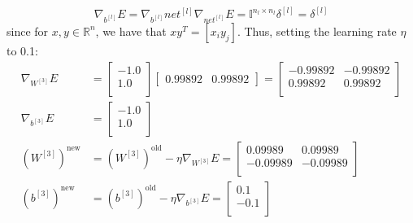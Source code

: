 \documentclass{exam}
\begin{document}
\begin{questions}
\begin{itemize}
            \begin{equation}
                \nabla_{b^{[l]}} E = \nabla_{b^{[l]}} net^{[l] }  \nabla_{net^{[l]}} E = \mathbb{I}^{n_l \times n_l} \delta^{[l]} = \delta^{[l]} \label{eq:4}
            \end{equation}
            since for $x, y \in \mathbb{R}^n$, we have that $xy^T = [x_i y_j]$. Thus, setting the learning rate  $\eta$ to 0.1:
            \begin{align*}
                \nabla_{W^{[3]}} E &= 
                \begin{bmatrix}
                    -1.0  \\
                    1.0  \\
                \end{bmatrix}
                \begin{bmatrix}
                    0.99892  & 
                    0.99892  
                \end{bmatrix} = 
                \begin{bmatrix}
                    -0.99892 & -0.99892  \\
                    0.99892 & 0.99892  \\
                \end{bmatrix} \\
                \nabla_{b^{[3]}} E &= 
                \begin{bmatrix}
                    -1.0  \\
                    1.0  \\
                \end{bmatrix} \\
                (W^{[3]})^{\text{new}} &= (W^{[3]})^{\text{old}} - \eta \nabla_{W^{[3]}} E = 
                \begin{bmatrix}
                    0.09989 & 0.09989  \\
                    -0.09989 & -0.09989  \\
                \end{bmatrix} \\
                (b^{[3]})^{\text{new}} &= (b^{[3]})^{\text{old}} - \eta \nabla_{b^{[3]}} E = 
                \begin{bmatrix}
                    0.1  \\
                    -0.1  \\
                \end{bmatrix}
            \end{align*}

\end{itemize}
\end{questions}
\end{document}
